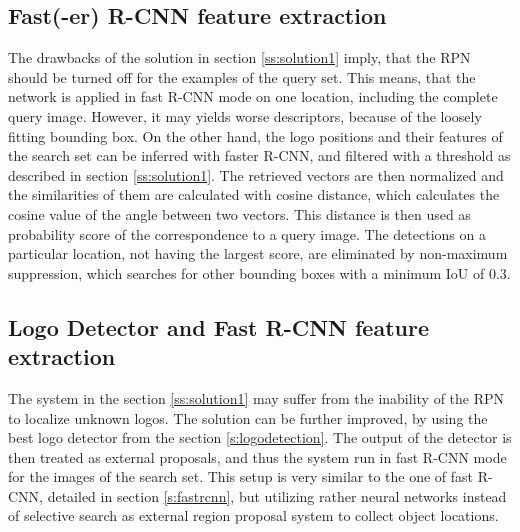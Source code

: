 \subsection{Fast(-er) R-CNN feature extraction}\label{ss:solution2}
The drawbacks of the solution in section \ref{ss:solution1} imply, that the RPN should be turned off for the examples of the query set. This means, that the network is applied in fast R-CNN mode on one location, including the complete query image. However, it may yields worse descriptors, because of the loosely fitting bounding box. On the other hand, the logo positions and their features of the search set can be inferred with faster R-CNN, and filtered with a threshold as described in section \ref{ss:solution1}. The retrieved vectors are then normalized and the similarities of them are calculated with cosine distance, which calculates the cosine value of the angle between two vectors. This distance is then used as probability score of the correspondence to a query image. The detections on a particular location, not having the largest score, are eliminated by non-maximum suppression, which searches for other bounding boxes with a minimum IoU of 0.3.
\bigbreak
\subsection{Logo Detector and Fast R-CNN feature extraction}\label{ss:solution3}
The system in the section \ref{ss:solution1} may suffer from the inability of the RPN to localize unknown logos. The solution can be further improved, by using the best logo detector from the section \ref{s:logodetection}.  The output of the detector is then treated as external proposals, and thus the system run in fast R-CNN mode for the images of the search set. This setup is very similar to the one of fast R-CNN, detailed in section \ref{s:fastrcnn}, but utilizing rather neural networks instead of selective search as external region proposal system to collect object locations.

